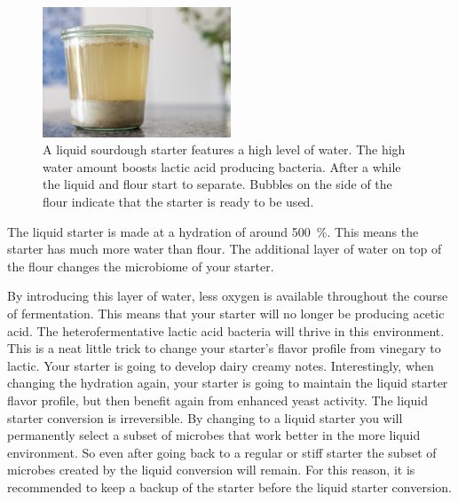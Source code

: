 \begin{figure}[!htb]
\centering
  \includegraphics[width=0.5\textwidth]{sourdough-starter-liquid.jpg}
  \caption[Liquid starter]{A liquid sourdough starter features a high level of
      water. The high water amount boosts lactic acid producing bacteria.
      After a while the liquid and flour start to separate. Bubbles on the
      side of the flour indicate that the starter is ready to be used.}%
  \label{fig:liquid-sourdough-starter}
\end{figure}


\begin{flowchart}[!htb]
\centering
  
  \caption[Converting to a liquid starter]{The process to convert your regular
      or stiff starter into a liquid starter. The whole process takes around
      3~days. The longer you maintain your starter at the suggested hydration
      level, the more adapted your microorganisms become. It is recommended to
      keep a backup of your original starter as the liquid environment will
      select anaerobic microorganisms. This boosts bacteria that create lactic
      acid rather than acetic acid. The resulting acidity will be perceived as
      milder. When beginning with a liquid starter your stiff starter will
      feature mild dairy notes. When beginning this process with a regular
      starter your created stiff starter will feature both dairy
      and vinegary notes.}%
  \label{flc:liquid-starter-conversion}
\end{flowchart}

The liquid starter is made at a hydration of around \qty{500}{\percent}. This means
the starter has much more water than flour. The additional layer of water on
top of the flour changes the microbiome of your starter.

By introducing this layer of water, less oxygen is available throughout the
course of fermentation. This means that your starter will no longer be
producing acetic acid. The heterofermentative lactic acid bacteria will thrive
in this environment. This is a neat little trick to change your starter's
flavor profile from vinegary to lactic. Your starter is going to develop dairy
creamy notes. Interestingly, when changing the hydration again, your starter
is going to maintain the liquid starter flavor profile, but then benefit again
from enhanced yeast activity. The liquid starter conversion is irreversible.
By changing to a liquid starter you will permanently select a subset of
microbes that work better in the more liquid environment. So even after going
back to a regular or stiff starter the subset of microbes created by the
liquid conversion will remain. For this reason, it is recommended to keep a
backup of the starter before the liquid starter conversion.

